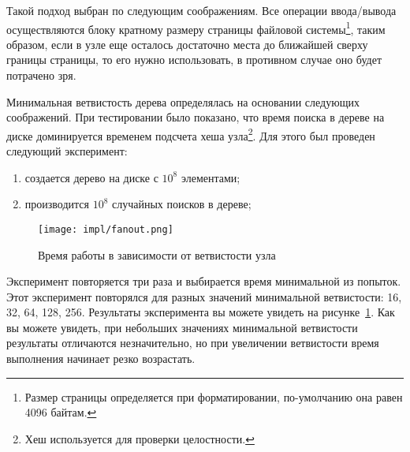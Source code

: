 Такой подход выбран по следующим соображениям. Все операции ввода/вывода
осуществляются блоку кратному размеру страницы файловой системы\footnote{Размер
страницы определяется при форматировании, по-умолчанию она равен 4096 байтам.},
таким образом, если в узле еще осталось достаточно места до ближайшей сверху
границы страницы, то его нужно использовать, в противном случае оно будет
потрачено зря.

Минимальная ветвистость дерева определялась на основании следующих соображений.
При тестировании было показано, что время поиска в дереве на диске доминируется
временем подсчета хеша узла\footnote{Хеш используется для проверки
целостности.}. Для этого был проведен следующий эксперимент:
\begin{enumerate}
  \item создается дерево на диске с $10^8$ элементами;
  \item производится $10^8$ случайных поисков в дереве;
\end{enumerate}

\begin{figure}[h]
  \centering
  \texttt{[image: impl/fanout.png]}
  \caption{Время работы в зависимости от ветвистости узла}
  \label{pic:fanout}
\end{figure}

Эксперимент повторяется три раза и выбирается время минимальной из попыток. Этот
эксперимент повторялся для разных значений минимальной ветвистости: 16, 32, 64,
128, 256. Результаты эксперимента вы можете увидеть на рисунке~\ref{pic:fanout}.
Как вы можете увидеть, при небольших значениях минимальной ветвистости
результаты отличаются незначительно, но при увеличении ветвистости время
выполнения начинает резко возрастать.

